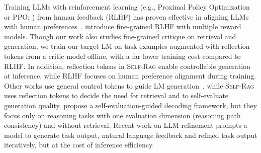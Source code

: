 \documentclass{article} %
\newcommand{\model}{\textsc{Self-Rag}\xspace}
\newcommand{\draftonly}[1]{#1}
\newcommand{\draftcomment}[3]{\draftonly{{\textcolor{#3}{[\textbf{#1--\textsc{#2}}]}}}}
\newcommand{\el}[1]{\draftcomment{\small #1}{ellen}{purple}}
\begin{document}
Training LLMs with reinforcement learning (e.g., Proximal Policy Optimization or PPO; \citealt{schulman2017proximal}) from human feedback (RLHF) has proven effective in aligning LLMs with human preferences~\citep{ouyang2022training}. 
\citet{wu2023fine} introduce fine-grained RLHF with multiple reward models. 
Though our work also studies fine-grained critique on retrieval and generation, we train our target LM on task examples augmented with reflection tokens from a critic 
model offline, with a far lower training cost compared to RLHF. In addition, reflection tokens in \model enable controllable generation at inference, while RLHF focuses on human preference alignment during training.
Other works use general control tokens to guide LM generation~\citep{lu2022quark,korbak2023pretraining}, while \model uses reflection tokens to decide the need for retrieval and to self-evaluate generation quality.
\cite{xie2023decomposition} propose a self-evaluation-guided decoding framework, but they focus only on reasoning tasks with one evaluation dimension (reasoning path consistency) and without retrieval.
% 
Recent work on LLM refinement \citep{dhuliawala2023chainofverification, madaan2023selfrefine, paul2023refiner} prompts a model to generate task output, natural language feedback and refined task output iteratively, but at the cost of inference efficiency.
\end{document}
